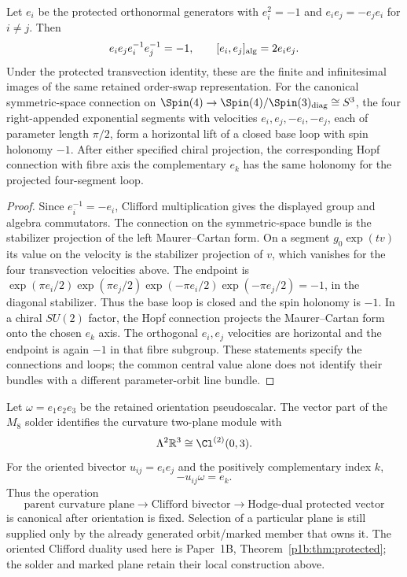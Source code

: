 \documentclass[12pt,a4paper]{article}
\begin{document}
\begin{theorem}
\label{p2c:thm:v188-clifford-central-commutator}
Let $e_i$ be the protected orthonormal generators with
$e_i^2=-1$ and $e_ie_j=-e_je_i$ for $i\ne j$. Then
\[
 e_ie_je_i^{-1}e_j^{-1}=-1,\qquad [e_i,e_j]_{\rm alg}=2e_ie_j.
\]
Under the protected transvection identity, these are the finite and
infinitesimal images of the same retained order-swap representation.
For the canonical symmetric-space connection on
$\Spin(4)\to\Spin(4)/\Spin(3)_{\rm diag}\cong S^3$,
the four right-appended exponential segments with velocities
$e_i,e_j,-e_i,-e_j$, each of parameter length $\pi/2$, form a horizontal
lift of a closed base loop with spin holonomy $-1$.
After either specified chiral projection, the corresponding Hopf connection
with fibre axis the complementary $e_k$ has the same holonomy for the
projected four-segment loop.
\end{theorem}
\begin{proof}
Since $e_i^{-1}=-e_i$, Clifford multiplication gives the displayed group
and algebra commutators. The connection on the symmetric-space bundle is
the stabilizer projection of the left Maurer--Cartan form. On a segment
$g_0\exp(tv)$ its value on the velocity is the stabilizer projection of $v$,
which vanishes for the four transvection velocities above.
The endpoint is
$\exp(\pi e_i/2)\exp(\pi e_j/2)\exp(-\pi e_i/2)\exp(-\pi e_j/2)=-1$,
in the diagonal stabilizer. Thus the base loop is closed and the spin
holonomy is $-1$.
In a chiral $SU(2)$ factor, the Hopf connection projects the Maurer--Cartan
form onto the chosen $e_k$ axis. The orthogonal $e_i,e_j$ velocities are
horizontal and the endpoint is again $-1$ in that fibre subgroup.
These statements specify the connections and loops; the common central
value alone does not identify their bundles with a different parameter-orbit
line bundle.
\end{proof}

\begin{corollary}
\label{p2c:cor:v188-curvature-bivector-normal}
Let $\omega=e_1e_2e_3$ be the retained orientation pseudoscalar.  The vector
part of the $M_8$ solder identifies the curvature two-plane module with
\[
 \Lambda^2\mathbb R^3\cong\Cl^{(2)}(0,3).
\]
For the oriented bivector $u_{ij}=e_ie_j$ and the positively complementary
index $k$,
\[
 \boxed{-u_{ij}\omega=e_k.}
\]
Thus the operation
\[
 \text{parent curvature plane}\longrightarrow
 \text{Clifford bivector}\longrightarrow
 \text{Hodge-dual protected vector}
\]
is canonical after orientation is fixed.  Selection of a particular plane is
still supplied only by the already generated orbit/marked member that owns it.
The oriented Clifford duality used here is Paper~1B,
Theorem~\ref{p1b:thm:protected}; the solder and marked plane retain their
local construction above.
\end{corollary}
\end{document}
